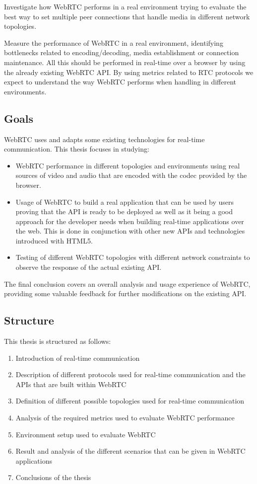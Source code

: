 Investigate how WebRTC performs in a real environment trying to evaluate the best way to set multiple peer connections that handle media in different network topologies. 

Measure the performance of WebRTC in a real environment, identifying bottlenecks related to encoding/decoding, media establishment or connection maintenance. All this should be performed in real-time over a browser by using the already existing WebRTC API. By using metrics related to RTC protocols we expect to understand the way WebRTC performs when handling in different environments.

\subsection{Goals}

WebRTC uses and adapts some existing technologies for real-time communication. This thesis focuses in studying:

\begin{itemize}
	\item WebRTC performance in different topologies and environments using real sources of video and audio that are encoded with the codec provided by the browser.
	
	\item Usage of WebRTC to build a real application that can be used by users proving that the API is ready to be deployed as well as it being a good approach for the developer needs when building real-time applications over the web. This is done in conjunction with other new APIs and technologies introduced with HTML5.
	
	\item Testing of different WebRTC topologies with different network constraints to observe the response of the actual existing API.
\end{itemize}

The final conclusion covers an overall analysis and usage experience of WebRTC, providing some valuable feedback for further modifications on the existing API.

\subsection{Structure}

This thesis is structured as follows: 

\begin{enumerate}
\item Introduction of real-time communication
\item Description of different protocols used for real-time communication and the APIs that are built within WebRTC
\item Definition of different possible topologies used for real-time communication
\item Analysis of the required metrics used to evaluate WebRTC performance
\item Environment setup used to evaluate WebRTC 
\item Result and analysis of the different scenarios that can be given in WebRTC applications
\item Conclusions of the thesis
\end{enumerate}
